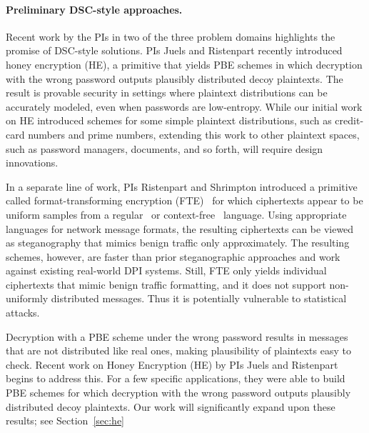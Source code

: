 {\paragraph{Preliminary DSC-style approaches.}
Recent work by the PIs in two of the three problem domains highlights the
promise of DSC-style solutions. PIs Juels and Ristenpart recently introduced
honey encryption (HE), a primitive that yields PBE schemes in which decryption with the
wrong password outputs plausibly distributed decoy plaintexts. The result is provable security in settings where plaintext distributions can be accurately modeled, even when passwords are low-entropy.  While our initial  work on HE introduced
schemes for some simple plaintext distributions, such as
credit-card numbers and prime numbers, extending this work to
other plaintext spaces, such as password managers, documents, and so forth, will require design innovations.

In a separate line of work, PIs Ristenpart and Shrimpton introduced a primitive
called format-transforming encryption (FTE)~\cite{Dyer-2013} for which
ciphertexts appear to be
uniform samples from a regular~\cite{Dyer-2013,luchaup2014libfte} 
or context-free~\cite{luchaup2014formatted} language.
Using appropriate languages for network message formats, the resulting
ciphertexts can be viewed as steganography that mimics 
benign traffic only approximately. The resulting 
schemes, however, are faster than prior steganographic approaches and work against
existing real-world DPI systems. Still, FTE only yields {individual} ciphertexts that
mimic benign traffic formatting, and it does not support non-uniformly 
distributed messages. Thus it is potentially
vulnerable to statistical attacks.  
 
\iffalse
Decryption with a PBE scheme under the wrong password results in
messages that are not distributed like real ones, making plausibility
of plaintexts easy to check.  Recent work on Honey Encryption (HE) by PIs Juels and
Ristenpart begins to address this.  For a few specific applications,
they were able to build PBE schemes for which decryption with the wrong
password outputs plausibly distributed decoy plaintexts. 
Our work will significantly expand upon these results; see Section~\ref{sec:he}

}
